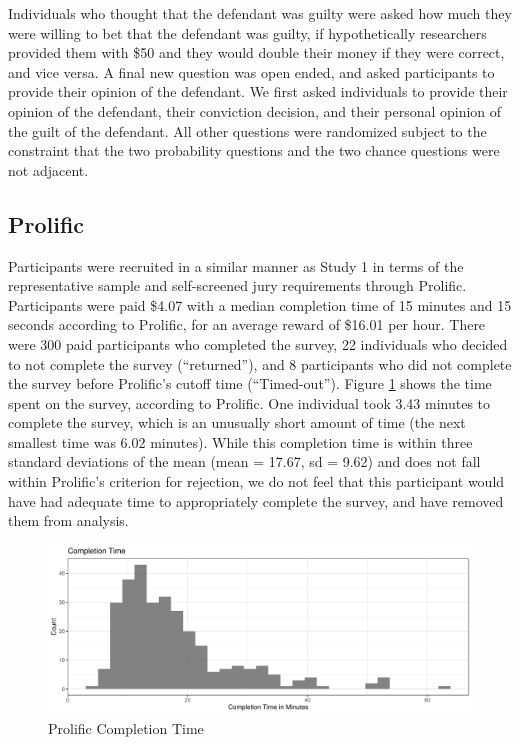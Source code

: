 \documentclass[print]{nuthesis}
\begin{document}
Individuals who thought that the defendant was guilty were asked how much they were willing to bet that the defendant was guilty, if hypothetically researchers provided them with \$50 and they would double their money if they were correct, and vice versa.
A final new question was open ended, and asked participants to provide their opinion of the defendant.
We first asked individuals to provide their opinion of the defendant, their conviction decision, and their personal opinion of the guilt of the defendant.
All other questions were randomized subject to the constraint that the two probability questions and the two chance questions were not adjacent.

\hypertarget{prolific-1}{%
\subsection{Prolific}\label{prolific-1}}

Participants were recruited in a similar manner as Study 1 in terms of the representative sample and self-screened jury requirements through Prolific.
Participants were paid \$4.07 with a median completion time of 15 minutes and 15 seconds according to Prolific, for an average reward of \$16.01 per hour.
There were 300 paid participants who completed the survey, 22 individuals who decided to not complete the survey (``returned''), and 8 participants who did not complete the survey before Prolific's cutoff time (``Timed-out'').
Figure \ref{fig:completiontime2} shows the time spent on the survey, according to Prolific.
One individual took 3.43 minutes to complete the survey, which is an unusually short amount of time (the next smallest time was 6.02 minutes).
While this completion time is within three standard deviations of the mean (mean = 17.67, sd = 9.62) and does not fall within Prolific's criterion for rejection, we do not feel that this participant would have had adequate time to appropriately complete the survey, and have removed them from analysis.

\begin{figure}

{\centering \includegraphics[width=\linewidth]{thesis_files/figure-latex/completiontime2-1} 

}

\caption{Prolific Completion Time}\label{fig:completiontime2}
\end{figure}
\end{document}
